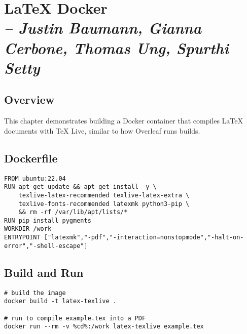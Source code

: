 \chapter{LaTeX Docker \\
\small{\textit{-- Justin Baumann, Gianna Cerbone, Thomas Ung, Spurthi Setty}} 
\label{Chapter::LaTeXDocker}}

\section{Overview}
This chapter demonstrates building a Docker container that compiles LaTeX documents with TeX Live, similar to how Overleaf runs builds.

\section{Dockerfile}
\begin{verbatim}
FROM ubuntu:22.04
RUN apt-get update && apt-get install -y \
    texlive-latex-recommended texlive-latex-extra \
    texlive-fonts-recommended latexmk python3-pip \
    && rm -rf /var/lib/apt/lists/*
RUN pip install pygments
WORKDIR /work
ENTRYPOINT ["latexmk","-pdf","-interaction=nonstopmode","-halt-on-error","-shell-escape"]
\end{verbatim}

\section{Build and Run}
\begin{verbatim}
# build the image
docker build -t latex-texlive .

# run to compile example.tex into a PDF
docker run --rm -v %cd%:/work latex-texlive example.tex
\end{verbatim}
